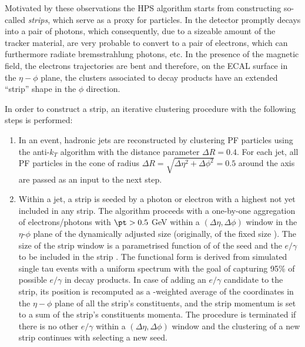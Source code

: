 Motivated by these observations the HPS algorithm starts from constructing so-called \textit{strips}, which serve as a proxy for \piz particles. In the detector \piz promptly decays into a pair of photons, which consequently, due to a sizeable amount of the tracker material, are very probable to convert to a pair of electrons, which can furthermore radiate bremsstrahlung photons, etc. In the presence of the magnetic field, the electrons trajectories are bent and therefore, on the ECAL surface in the $\eta-\phi$ plane, the clusters associated to \piz decay products have an extended \enquote{strip} shape in the $\phi$ direction.

In order to construct a strip, an iterative clustering procedure with the following steps is performed:

\begin{enumerate}
    \item In an event, hadronic jets are reconstructed by clustering PF particles using the anti-$k_T$ algorithm \cite{Cacciari:2008gp} with the distance parameter $\Delta R = 0.4$. For each jet, all PF particles in the cone of radius $\Delta R = \sqrt{\Delta \eta^2 + \Delta  \phi^2} = 0.5$ around the axis are passed as an input to the next step. 
    \item Within a jet, a strip is seeded by a photon or electron with a highest \pt not yet included in any strip. The algorithm proceeds with a one-by-one aggregation of electrons/photons with $\pt > 0.5$ GeV within a $(\Delta \eta, \Delta  \phi)$ window in the $\eta$-$\phi$ plane of the dynamically adjusted size (originally, of the fixed size \cite{CMS:2015pac}). The size of the strip window is a parametrised function of \pt of the seed and the $e/\gamma$ to be included in the strip \cite{CMS:2018jrd}. The functional form is derived from simulated single tau events with a uniform \pt spectrum with the goal of capturing 95\% of possible $e/\gamma$ in \tauh decay products. In case of adding an $e/\gamma$ candidate to the strip, its position is recomputed as a \pt-weighted average of the coordinates in the $\eta-\phi$ plane of all the strip’s constituents, and the strip momentum is set to a sum of the strip’s constituents momenta. The procedure is terminated if there is no other $e/\gamma$ within a $(\Delta \eta, \Delta  \phi)$ window and the clustering of a new strip continues with selecting a new seed.

\end{enumerate}
